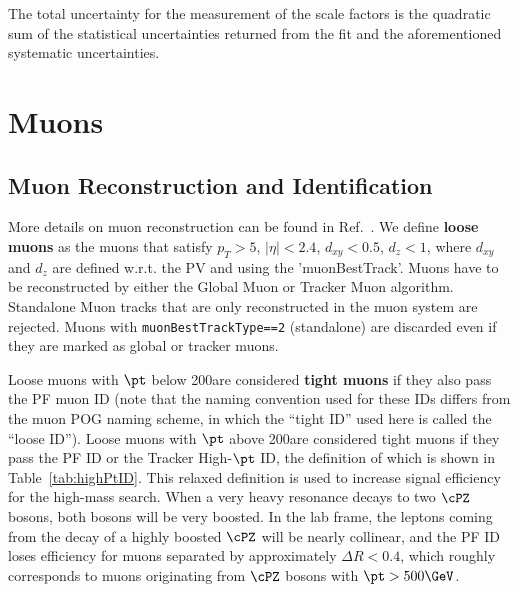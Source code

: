 The total uncertainty for the measurement of the scale factors is the quadratic sum of the statistical uncertainties returned from the fit and the aforementioned systematic uncertainties.


\section{Muons}

\subsection{Muon Reconstruction and Identification}
\label{sec:muonReco}

More details on muon reconstruction can be found in Ref.~\cite{AN-15-277}.
We define {\bf loose muons} as the muons that satisfy  
$p_T > 5$, $|\eta| < 2.4$, $d_{xy}< 0.5$, $d_z < 1$, where $d_{xy}$ and $d_z$ are 
defined w.r.t. the PV and using the 'muonBestTrack'. Muons have to be 
reconstructed by either the Global Muon or Tracker Muon algorithm. Standalone 
Muon tracks that are only reconstructed in the muon system are rejected.
Muons with \verb|muonBestTrackType==2| (standalone) are discarded even if they 
are marked as global or tracker muons. 

Loose muons with $\pt$ below 200\GeV are considered {\bf tight muons} if they 
also pass the PF muon ID (note that the naming 
convention used for these IDs differs from the muon POG naming scheme, in which
the ``tight ID'' used here is called the ``loose ID''). Loose muons with $\pt$ 
above 200\GeV are considered tight muons if they pass the PF ID or the Tracker
High-$\pt$ ID, the definition of which is shown in Table~\ref{tab:highPtID}.
This relaxed definition is used to increase signal efficiency for the high-mass
search. When a very heavy resonance decays to two $\cPZ$ bosons, both bosons
will be very boosted. In the lab frame, the leptons coming from the decay of
a highly boosted $\cPZ$ will be nearly collinear, and the PF ID loses 
efficiency for muons separated by approximately $\Delta R < 0.4$, which roughly 
corresponds to muons originating from $\cPZ$ bosons with $\pt > 500\GeV$.

